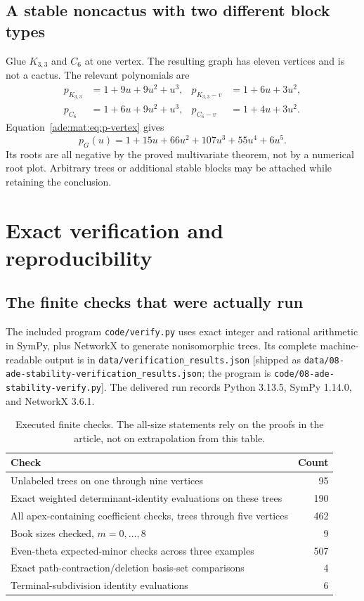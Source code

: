 \documentclass[11pt]{article}
\numberwithin{equation}{section}
\theoremstyle{definition}
\begin{document}
\subsection{A stable noncactus with two different block types}
\label{ade:mat:sec:examples}
Glue $K_{3,3}$ and $C_6$ at one vertex. The resulting graph has eleven
vertices and is not a cactus. The relevant polynomials are
\begin{align*}
 p_{K_{3,3}}&=1+9u+9u^2+u^3,& p_{K_{3,3}-v}&=1+6u+3u^2,\\
 p_{C_6}&=1+6u+9u^2+u^3,&p_{C_6-v}&=1+4u+3u^2.
\end{align*}
Equation~\eqref{ade:mat:eq:p-vertex} gives
\begin{equation}
 p_G(u)=1+15u+66u^2+107u^3+55u^4+6u^5.
\label{ade:mat:eq:glued-example}
\end{equation}
Its roots are all negative by the proved multivariate theorem, not by a
numerical root plot. Arbitrary trees or additional stable blocks may be
attached while retaining the conclusion.

\section{Exact verification and reproducibility}
\label{ade:sec:verification}

\subsection{The finite checks that were actually run}

The included program \texttt{code/verify.py} uses exact integer and
rational arithmetic in SymPy, plus NetworkX to generate nonisomorphic
trees.  Its complete machine-readable output is in
\texttt{data/verification\_results.json} [shipped as
\nolinkurl{data/08-ade-stability-verification_results.json}; the program is
\nolinkurl{code/08-ade-stability-verify.py}].  The delivered run records
Python 3.13.5, SymPy 1.14.0, and NetworkX 3.6.1.

\begin{table}[htbp]
\centering
\begin{tabular}{p{}r}
\toprule
Check & Count\\
\midrule
Unlabeled trees on one through nine vertices &95\\
Exact weighted determinant-identity evaluations on these trees &190\\
All apex-containing coefficient checks, trees through five vertices &462\\
Book sizes checked, $m=0,\ldots,8$ &9\\
Even-theta expected-minor checks across three examples &507\\
Exact path-contraction/deletion basis-set comparisons &4\\
Terminal-subdivision identity evaluations &6\\
\bottomrule
\end{tabular}
\caption{Executed finite checks.  The all-size statements rely on the
proofs in the article, not on extrapolation from this table.}
\label{ade:tab:checks}
\end{table}
\end{document}
